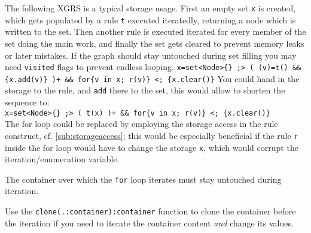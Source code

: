\begin{example}
The following XGRS is a typical storage usage.
First an empty set \texttt{x} is created, which gets populated by a rule \texttt{t} executed iteratedly, returning a node which is written to the set.
Then another rule is executed iterated for every member of the set doing the main work, and finally the set gets cleared to prevent memory leaks or later mistakes.
If the graph should stay untouched during set filling you may need \texttt{visited} flags to prevent endless looping.
\verb#x=set<Node>{} ;> ( (v)=t() && {x.add(v)} )+ && for{v in x; r(v)} <; {x.clear()}#
You could hand in the storage to the rule, and \texttt{add} there to the set, this would allow to shorten the sequence to:\\
\verb#x=set<Node>{} ;> ( t(x) )+ && for{v in x; r(v)} <; {x.clear()}#\\
The for loop could be replaced by employing the storage access in the rule construct, cf. \ref{sub:storageaccess}; this would be especially beneficial if the rule \texttt{r} inside the for loop would have to change the storage \texttt{x}, which would corrupt the iteration/enumeration variable.
\end{example}

\begin{warning}
The container over which the \texttt{for} loop iterates must stay untouched during iteration.

Use the \texttt{clone(.:container):container} function to clone the container before the iteration if you need to iterate the container content \emph{and} change its values.
\end{warning}



